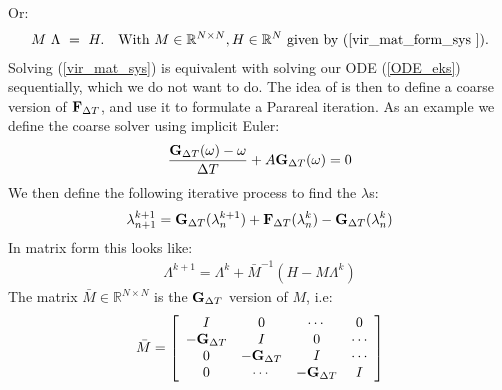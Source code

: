 Or:
\begin{align}
M \ \Lambda \ = \ H.\quad \textrm{With $M\in\mathbb{R}^{N\times N},H\in\mathbb{R}^N$ given by (\ref{vir_mat_form_sys }).} \label{vir_mat_sys}
\end{align}
Solving (\ref{vir_mat_sys}) is equivalent with solving our ODE (\ref{ODE_eks}) sequentially, which we do not want to do. The idea of \cite{maday2002parareal} is then to define a coarse version of $\bold{F}_{\Delta T}$, and use it to formulate a Parareal iteration. As an example we define the coarse solver using implicit Euler:
 \begin{align}
\frac{\bold{G}_{\Delta T}(\omega) -\omega }{\Delta T } + A \bold{G}_{\Delta T}(\omega) = 0
\end{align}  
We then define the following iterative process to find the $\lambda$s:
\begin{align}
\lambda_{n+1}^{k+1} = \bold{G}_{\Delta T}(\lambda_{n}^{k+1}) + \bold{F}_{\Delta T}(\lambda_{n}^{k})-\bold{G}_{\Delta T}(\lambda_{n}^{k})
\end{align} 
In matrix form this looks like:
\begin{align}
\Lambda^{k+1} = \Lambda^k + \bar{M}^{-1}(H-M\Lambda^k) \label{matrix_iter1}
\end{align}
The matrix $\bar{M}\in\mathbb{R}^{N\times N}$ is the $\bold{G}_{\Delta T}$ version of $M$, i.e:
\begin{align}
\bar{M} = \left[ \begin{array}{cccc}
   I & 0 & \cdots & 0 \\  
   -\bold{G}_{\Delta T} & I & 0 & \cdots \\ 
   0 &-\bold{G}_{\Delta T} & I  & \cdots \\
   0 &\cdots &-\bold{G}_{\Delta T} & I   \\
   \end{array}  \right]
\end{align}